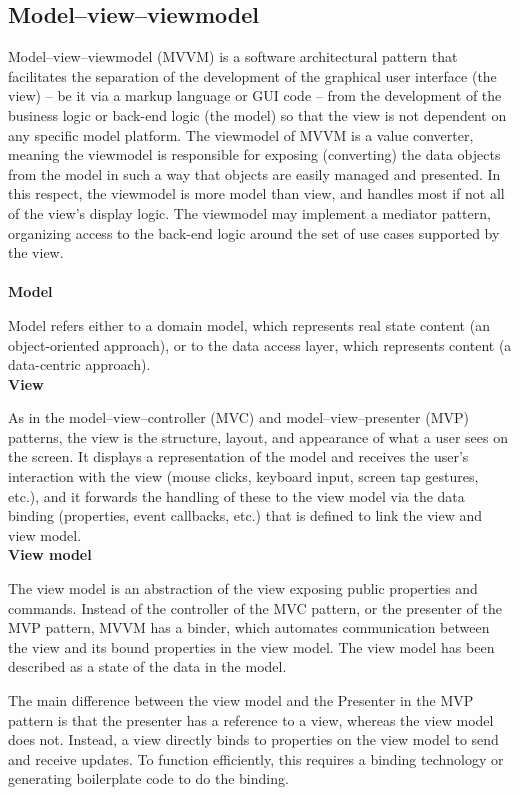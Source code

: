 \documentclass[12pt]{article}
\begin{document}
\subsection{Model–view–viewmodel}
Model–view–viewmodel (MVVM) is a software architectural pattern that facilitates the separation of the development of the graphical user interface (the view) – be it via a markup language or GUI code – from the development of the business logic or back-end logic (the model) so that the view is not dependent on any specific model platform. The viewmodel of MVVM is a value converter, meaning the viewmodel is responsible for exposing (converting) the data objects from the model in such a way that objects are easily managed and presented. In this respect, the viewmodel is more model than view, and handles most if not all of the view's display logic. The viewmodel may implement a mediator pattern, organizing access to the back-end logic around the set of use cases supported by the view.
\\
\\
\textbf {Model}
\par 
Model refers either to a domain model, which represents real state content (an object-oriented approach), or to the data access layer, which represents content (a data-centric approach).
\\
\textbf{View}
\par
As in the model–view–controller (MVC) and model–view–presenter (MVP) patterns, the view is the structure, layout, and appearance of what a user sees on the screen. It displays a representation of the model and receives the user's interaction with the view (mouse clicks, keyboard input, screen tap gestures, etc.), and it forwards the handling of these to the view model via the data binding (properties, event callbacks, etc.) that is defined to link the view and view model.
\\
\textbf{View model}
\par
The view model is an abstraction of the view exposing public properties and commands. Instead of the controller of the MVC pattern, or the presenter of the MVP pattern, MVVM has a binder, which automates communication between the view and its bound properties in the view model. The view model has been described as a state of the data in the model.\par
The main difference between the view model and the Presenter in the MVP pattern is that the presenter has a reference to a view, whereas the view model does not. Instead, a view directly binds to properties on the view model to send and receive updates. To function efficiently, this requires a binding technology or generating boilerplate code to do the binding.
\end{document}
